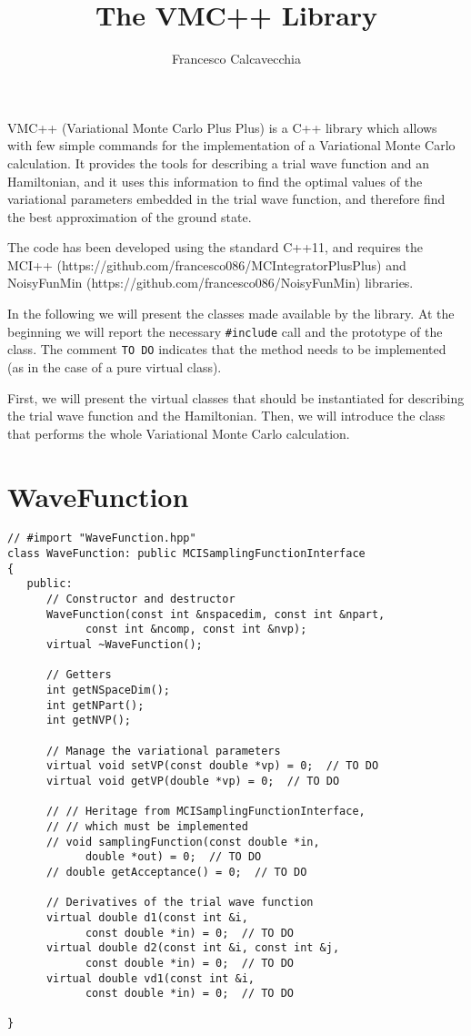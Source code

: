 \documentclass[11pt,a4paper,twoside]{article}
\title{The VMC++ Library}
\author{Francesco Calcavecchia}
\begin{document}
\maketitle

VMC++ (Variational Monte Carlo Plus Plus) is a C++ library which allows with few simple commands for the implementation of a Variational Monte Carlo calculation.
It provides the tools for describing a trial wave function and an Hamiltonian, and it uses this information to find the optimal values of the variational parameters embedded in the trial wave function, and therefore find the best approximation of the ground state.

The code has been developed using the standard C++11, and requires the MCI++ (https://github.com/francesco086/MCIntegratorPlusPlus) and NoisyFunMin (https://github.com/francesco086/NoisyFunMin) libraries.

In the following we will present the classes made available by the library.
At the beginning we will report the necessary \verb+#include+ call and the prototype of the class.
The comment \verb+TO DO+ indicates that the method needs to be implemented (as in the case of a pure virtual class).

First, we will present the virtual classes that should be instantiated for describing the trial wave function and the Hamiltonian.
Then, we will introduce the class that performs the whole Variational Monte Carlo calculation.


\section{WaveFunction} %
\label{sec:wave_function}

\begin{lstlisting}
// #import "WaveFunction.hpp"
class WaveFunction: public MCISamplingFunctionInterface
{
   public:
      // Constructor and destructor
      WaveFunction(const int &nspacedim, const int &npart,
            const int &ncomp, const int &nvp);
      virtual ~WaveFunction();

      // Getters
      int getNSpaceDim();
      int getNPart();
      int getNVP();

      // Manage the variational parameters
      virtual void setVP(const double *vp) = 0;  // TO DO
      virtual void getVP(double *vp) = 0;  // TO DO

      // // Heritage from MCISamplingFunctionInterface,
      // // which must be implemented
      // void samplingFunction(const double *in,
            double *out) = 0;  // TO DO
      // double getAcceptance() = 0;  // TO DO

      // Derivatives of the trial wave function
      virtual double d1(const int &i,
            const double *in) = 0;  // TO DO
      virtual double d2(const int &i, const int &j,
            const double *in) = 0;  // TO DO
      virtual double vd1(const int &i,
            const double *in) = 0;  // TO DO

}
\end{lstlisting}
\end{document}
